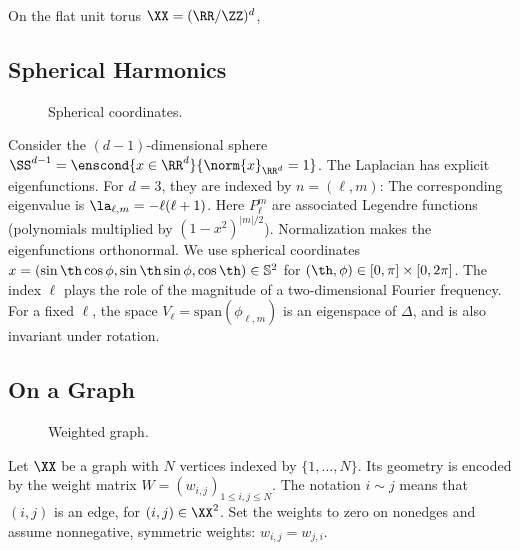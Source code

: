 On the flat unit torus $\XX=(\RR/\ZZ)^d$,

\subsection{Spherical Harmonics}
\label{sec-spherical-harm}

\begin{figure}[tbp]
\centering
{}
\caption{Spherical coordinates.}
\label{fig-review-fourier-spherical-coordinates}
\end{figure}
Consider the $(d-1)$-dimensional sphere $\SS^{d-1} = \enscond{x \in \RR^d}{\norm{x}_{\RR^d}=1}$.
% 
The Laplacian has explicit eigenfunctions. For $d=3$, they are indexed by $n=(\ell,m)$:
The corresponding eigenvalue is $\la_{\ell,m} = -\ell(\ell+1)$. Here $P_{\ell}^m$ are associated Legendre functions (polynomials multiplied by $(1-x^2)^{|m|/2}$). Normalization makes the eigenfunctions orthonormal. We use spherical coordinates $x=(\sin\th\cos\phi,\sin\th\sin\phi,\cos\th)\in\mathbb S^2$ for $(\th,\phi) \in [0,\pi] \times [0,2\pi]$.
%
The index $\ell$ plays the role of the magnitude of a two-dimensional Fourier frequency.
%
For a fixed $\ell$, the space $V_\ell = \text{span}( \phi_{\ell,m} )$ is an eigenspace of $\Delta$, and is also invariant under rotation. 
	

\subsection{On a Graph}

\begin{figure}[tbp]
\centering
{}
\caption{Weighted graph.}
\label{fig-review-fourier-weighted-graph}
\end{figure}
Let $\XX$ be a graph with $N$ vertices indexed by $\{1,\ldots,N\}$. Its geometry is encoded by the weight matrix $W=(w_{i,j})_{1\leq i,j\leq N}$. The notation $i \sim j$ means that $(i,j)$ is an edge, for $(i,j) \in \XX^2$. Set the weights to zero on nonedges and assume nonnegative, symmetric weights: $w_{i,j}=w_{j,i}$.

